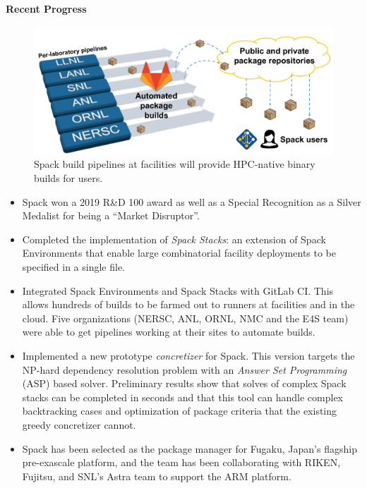 \paragraph{Recent Progress}

\begin{figure}[tb]
\centering
\includegraphics[width=.75\textwidth]{projects/2.3.6-NNSA/2.3.6.02-LLNL-ATDM/spack-pipelines.pdf}
\caption{Spack build pipelines at facilities will provide HPC-native binary builds for users.}
\end{figure}


\begin{itemize}
\item Spack won a 2019 R\&D 100 award as well as a Special Recognition
      as a Silver Medalist for being a ``Market Disruptor''.

\item Completed the implementation of {\it Spack Stacks}: an extension of Spack
      Environments that enable large combinatorial facility deployments to
      be specified in a single file.

\item Integrated Spack Environments and Spack Stacks with GitLab CI.  This
      allows hundreds of builds to be farmed out to runners at facilities and
      in the cloud.  Five organizations (NERSC, ANL, ORNL, NMC and the E4S team)
      were able to get pipelines working at their sites to automate builds.

\item Implemented a new prototype {\it concretizer} for Spack.  This version
      targets the NP-hard dependency resolution problem with an {\it
      Answer Set Programming} (ASP) based solver.  Preliminary results
      show that solves of complex Spack stacks can be completed in
      seconds and that this tool can handle complex backtracking cases
      and optimization of package criteria that the existing greedy
      concretizer cannot.

\item Spack has been selected as the package manager for Fugaku, Japan's
      flagship pre-exascale platform, and the team has been collaborating
      with RIKEN, Fujitsu, and SNL's Astra team to support the ARM
      platform.
\end{itemize}

